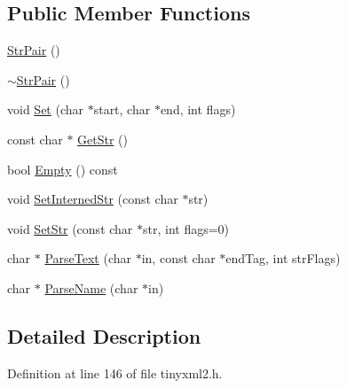 \subsection*{Public Member Functions}
\begin{DoxyCompactItemize}
\item 
\hyperlink{classtinyxml2_1_1_str_pair_a69153963f7052de9f767d3d8c1623a70}{Str\+Pair} ()
\item 
\hyperlink{classtinyxml2_1_1_str_pair_a60bed84d2503296e1c2a73fcef1431f9}{$\sim$\+Str\+Pair} ()
\item 
void \hyperlink{classtinyxml2_1_1_str_pair_a4f05549373394266a1eecba26813c166}{Set} (char $\ast$start, char $\ast$end, int flags)
\item 
const char $\ast$ \hyperlink{classtinyxml2_1_1_str_pair_ad87e3d11330f5e689ba1e7e54c023b57}{Get\+Str} ()
\item 
bool \hyperlink{classtinyxml2_1_1_str_pair_affa1043e73a18f05d5d2faec055725a7}{Empty} () const 
\item 
void \hyperlink{classtinyxml2_1_1_str_pair_a2baf6230e18333e02ab65d0897ee3941}{Set\+Interned\+Str} (const char $\ast$str)
\item 
void \hyperlink{classtinyxml2_1_1_str_pair_a1f82ec6b5bee35ee7466d8565e43b1de}{Set\+Str} (const char $\ast$str, int flags=0)
\item 
char $\ast$ \hyperlink{classtinyxml2_1_1_str_pair_ad90521f188e9606a8fbafe5d86fb2246}{Parse\+Text} (char $\ast$in, const char $\ast$end\+Tag, int str\+Flags)
\item 
char $\ast$ \hyperlink{classtinyxml2_1_1_str_pair_aa6d8998efceba41d87ec2300c70a6085}{Parse\+Name} (char $\ast$in)
\end{DoxyCompactItemize}


\subsection{Detailed Description}


Definition at line 146 of file tinyxml2.\+h.



